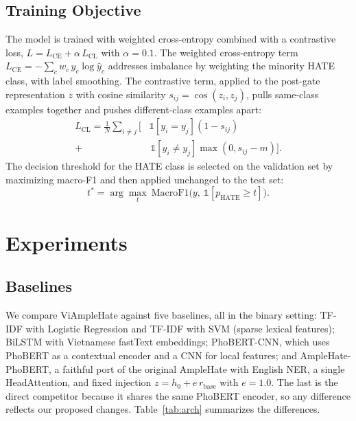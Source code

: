 \documentclass[11pt]{article}
\begin{document}
\subsection{Training Objective}
The model is trained with weighted cross-entropy combined with a contrastive loss, $L = L_{\mathrm{CE}} + \alpha\, L_{\mathrm{CL}}$ with $\alpha = 0.1$. The weighted cross-entropy term $L_{\mathrm{CE}} = -\sum_c w_c\,y_c\log \hat y_c$ addresses imbalance by weighting the minority HATE class, with label smoothing. The contrastive term, applied to the post-gate representation $z$ with cosine similarity $s_{ij}=\cos(z_i,z_j)$, pulls same-class examples together and pushes different-class examples apart:
\begin{equation}
\begin{split}
  L_{\mathrm{CL}} = \frac{1}{N}\sum_{i\neq j}\big[&\mathbb{1}[y_i{=}y_j](1-s_{ij}) \\[-2pt]
   + &\,\mathbb{1}[y_i{\neq}y_j]\max(0, s_{ij}-m)\big].
\end{split}
\end{equation}
The decision threshold for the HATE class is selected on the validation set by maximizing macro-F1 and then applied unchanged to the test set:
\begin{equation}
  t^{*} = \arg\max_t\ \mathrm{MacroF1}\big(y,\ \mathbb{1}[p_{\mathrm{HATE}}\ge t]\big).
\end{equation}

\section{Experiments}

\subsection{Baselines}
We compare ViAmpleHate against five baselines, all in the binary setting: TF-IDF with Logistic Regression and TF-IDF with SVM (sparse lexical features); BiLSTM with Vietnamese fastText embeddings; PhoBERT-CNN, which uses PhoBERT as a contextual encoder and a CNN for local features; and AmpleHate-PhoBERT, a faithful port of the original AmpleHate with English NER, a single HeadAttention, and fixed injection $z = h_0 + e\,r_{\mathrm{base}}$ with $e=1.0$. The last is the direct competitor because it shares the same PhoBERT encoder, so any difference reflects our proposed changes. Table~\ref{tab:arch} summarizes the differences.
\end{document}
